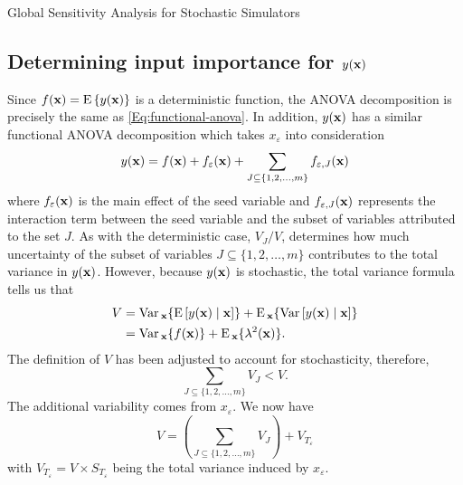 \begin{chapter}{Global Sensitivity Analysis for Stochastic Simulators\label{Ch:sensitivity}}
\subsection{Determining input importance for $y(\mathbf{x})$}
Since $f(\mathbf{x}) = \textrm{E}\, \{ y(\mathbf{x}) \}$ is a deterministic function, the ANOVA decomposition is precisely the same as \cref{Eq:functional-anova}. In addition, $y(\mathbf{x})$ has a similar functional ANOVA decomposition which takes $x_\varepsilon$ into consideration
\begin{equation}
y(\mathbf{x}) = f(\mathbf{x}) + f_\varepsilon(\mathbf{x}) + \sum_{J \subseteq \{1, 2, \ldots, m\}} f_{\varepsilon, J}(\mathbf{x}) \label{Eq:stoch-anova}
\end{equation}
where $f_\varepsilon(\mathbf{x})$ is the main effect of the seed variable and $f_{\varepsilon, J}(\mathbf{x})$ represents the interaction term between the seed variable and the subset of variables attributed to the set $J$. As with the deterministic case, $V_J/V$, determines how much uncertainty of the subset of variables $J \subseteq \{1, 2, \ldots, m \}$ contributes to the total variance in $y(\mathbf{x})$. However, because $y(\mathbf{x})$ is stochastic, the total variance formula tells us that
\begin{align}
V & = \mathrm{Var}\,_{\mathbf{x}} \{ \textrm{E}\,[y(\mathbf{x}) \mid \mathbf{x} ] \} + \textrm{E}\,_{\mathbf{x}} \{ \mathrm{Var}\,[y(\mathbf{x}) \mid \mathbf{x}] \}\\
  &  = \mathrm{Var}\,_{\mathbf{x}} \{ f(\mathbf{x}) \} + \textrm{E}\,_{\mathbf{x}} \{ \lambda^2(\mathbf{x}) \}.
\end{align}
The definition of $V$ has been adjusted to account for stochasticity, therefore,
\begin{equation}
\sum_{J \subseteq \{1, 2, \ldots, m \} } V_J < V.
\end{equation}
The additional variability comes from $x_\varepsilon$. We now have
\begin{equation}
V = \left( \sum_{J \subseteq \{1, 2, \ldots, m \} } V_J \right)+ V_{T_{\varepsilon}}
\end{equation}
with $V_{T_{\varepsilon}}  = V \times S_{T_\varepsilon}$ being the total variance induced by $x_\varepsilon$.

\end{chapter}
